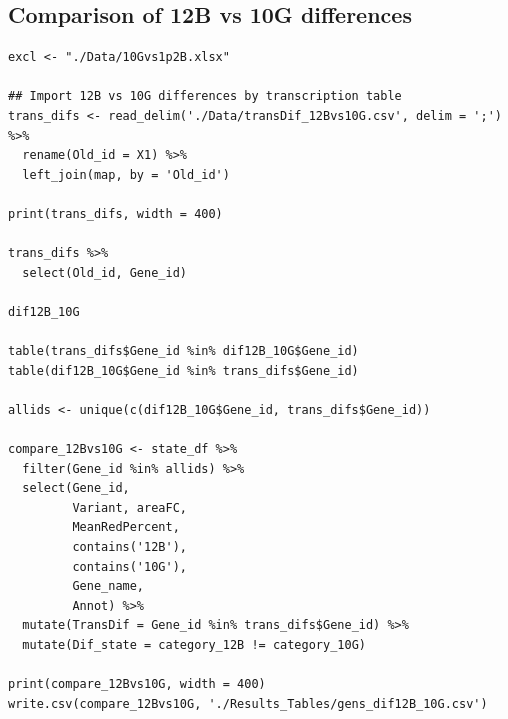 \documentclass[11pt]{article}
\begin{document}
\subsection{Comparison of 12B vs 10G differences}
\label{sec:org83095f9}
\begin{verbatim}
excl <- "./Data/10Gvs1p2B.xlsx"

## Import 12B vs 10G differences by transcription table
trans_difs <- read_delim('./Data/transDif_12Bvs10G.csv', delim = ';') %>%
  rename(Old_id = X1) %>%
  left_join(map, by = 'Old_id')

print(trans_difs, width = 400)

trans_difs %>%
  select(Old_id, Gene_id)

dif12B_10G

table(trans_difs$Gene_id %in% dif12B_10G$Gene_id)
table(dif12B_10G$Gene_id %in% trans_difs$Gene_id)

allids <- unique(c(dif12B_10G$Gene_id, trans_difs$Gene_id))

compare_12Bvs10G <- state_df %>%
  filter(Gene_id %in% allids) %>%
  select(Gene_id,
         Variant, areaFC,
         MeanRedPercent,
         contains('12B'),
         contains('10G'),
         Gene_name,
         Annot) %>%
  mutate(TransDif = Gene_id %in% trans_difs$Gene_id) %>%
  mutate(Dif_state = category_12B != category_10G)

print(compare_12Bvs10G, width = 400)
write.csv(compare_12Bvs10G, './Results_Tables/gens_dif12B_10G.csv')
\end{verbatim}
\end{document}
